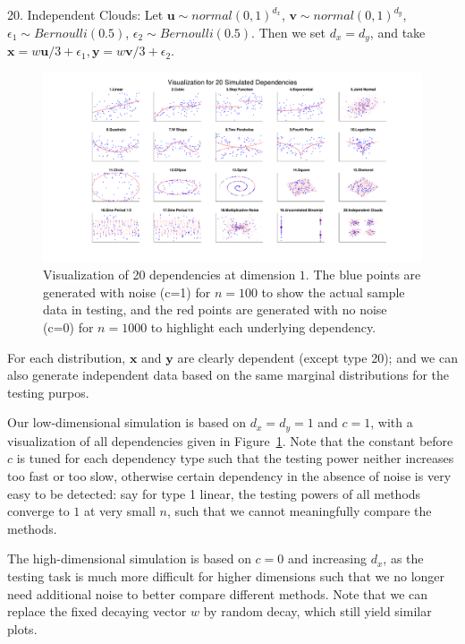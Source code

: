 \documentclass[11pt]{article}
\providecommand{\mb}[1]{\boldsymbol{#1}}
\newcommand{\jv}[1]{{\color{red}{#1}}}
\begin{document}
20. Independent Clouds: Let $\mb{u} \sim normal(0,1)^{d_{x}}$, $\mb{v} \sim normal(0,1)^{d_{y}}$, $\epsilon_{1} \sim Bernoulli(0.5)$, $\epsilon_{2} \sim Bernoulli(0.5)$. Then we set $d_{x}=d_{y}$, and take $\mb{x}=w\mb{u}/3+\epsilon_{1}, \mb{y}=w\mb{v}/3+\epsilon_{2}$.

\begin{figure}[htbp]
\includegraphics[width=1.0\textwidth]{../Figures/Fig0}
\caption{Visualization of 20 dependencies at dimension $1$. The blue points are generated with noise (c=1) for $n=100$ to show the actual sample data in testing, and the red points are generated with no noise (c=0) for $n=1000$ to highlight each underlying dependency.}
\label{fig0}
\end{figure}


For each distribution, $\mb{x}$ and $\mb{y}$ are clearly dependent (except type 20); and we can also generate independent data based on the same marginal distributions for the testing purpos.  \jv{explain how. most you set $w$ to zero, but not all.}

Our low-dimensional simulation is based on $d_{x}=d_{y}=1$ and $c=1$, with a visualization of all dependencies given in Figure~\ref{fig0}. Note that the constant before $c$ is tuned for each dependency type such that the testing power neither increases too fast or too slow, otherwise certain dependency in the absence of noise is very easy to be detected: say for type 1 linear, the testing powers of all methods converge to $1$ at very small $n$, such that we cannot meaningfully compare the methods. \jv{what is the constant ``before $c$''?}

The high-dimensional simulation is based on $c=0$ and increasing $d_{x}$, as the testing task is much more difficult for higher dimensions such that we no longer need additional noise to better compare different methods. Note that we can replace the fixed decaying vector $w$ by random decay, which still yield similar plots.
\end{document}
